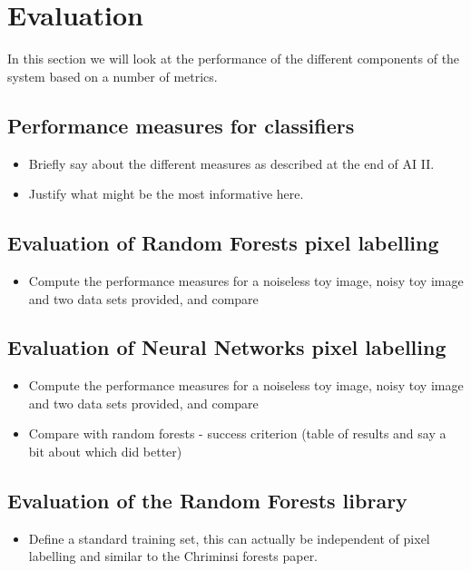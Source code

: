 \documentclass[12pt,twoside,notitlepage]{report}
\begin{document}

\cleardoublepage
\chapter{Evaluation}
    In this section we will look at the performance of the different components of the system based on a number of 
    metrics. 

    \section{Performance measures for classifiers}
        \begin{itemize}
            \item Briefly say about the different measures as described at the end of AI II.
            \item Justify what might be the most informative here.
        \end{itemize}

    \section{Evaluation of Random Forests pixel labelling}
        \begin{itemize}
            \item Compute the performance measures for a noiseless toy image, noisy toy image and two data sets provided, and compare
        \end{itemize}


    \section{Evaluation of Neural Networks pixel labelling}
        \begin{itemize}
            \item Compute the performance measures for a noiseless toy image, noisy toy image and two data sets provided, and compare
            \item Compare with random forests - success criterion (table of results and say a bit about which did better)
        \end{itemize}

    \section{Evaluation of the Random Forests library}
        \begin{itemize}
            \item Define a standard training set, this can actually be independent of pixel labelling and similar to the Chriminsi forests paper.
        \end{itemize}
\end{document}
